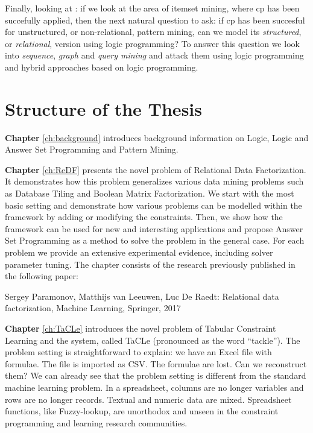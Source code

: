 Finally, looking at \cfour: if we look at the area of itemset mining, where \acrlong{cp}
has been succefully applied, then the next natural question to ask:
if \acrshort{cp} has been succesful for unstructured, or
non-relational, pattern mining, can we model its \textit{structured},
or \textit{relational}, version using logic programming? To answer
this question we look into \textit{sequence}, \textit{graph} and
\textit{query mining} and attack them using logic programming and
hybrid approaches based on logic programming.


\section{Structure of the Thesis}
\textbf{Chapter} \ref{ch:background} introduces background information on Logic, Logic and Answer Set Programming and Pattern Mining.

\textbf{Chapter} \ref{ch:ReDF} presents the novel problem of Relational Data
Factorization. It demonstrates how this problem generalizes various
data mining problems such as Database Tiling and Boolean Matrix
Factorization. We start with the most basic setting and demonstrate
how various problems can be modelled within the framework by adding
or modifying the constraints. Then, we show how the framework can be
used for new and interesting applications and propose Answer Set
Programming as a method to solve the problem in the general case.
For each problem we provide an extensive experimental evidence,
including solver parameter tuning. The chapter consists of the
research previously published in the following paper:

\begin{addmargin}[2em]{2em}

Sergey Paramonov,  Matthijs van Leeuwen, Luc De Raedt: Relational data
factorization, Machine Learning, Springer, 2017

\end{addmargin}



\textbf{Chapter} \ref{ch:TaCLe} introduces  the novel problem of
Tabular Constraint Learning and the system, called TaCLe (pronounced
as the word ``tackle''). The problem setting is straightforward to
explain: we have an Excel file with formulae. The file is imported as
CSV. The formulae are lost. Can we reconstruct them? We can already 
see that the problem setting is different from the standard machine
learning problem. In a spreadsheet, columns are no longer variables
and rows are no longer records. Textual and numeric data are mixed.
Spreadsheet functions, like Fuzzy-lookup, are unorthodox and unseen in
the constraint programming and learning research communities.

